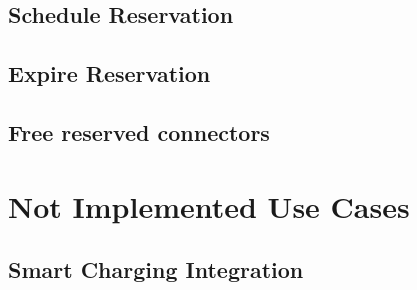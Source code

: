 \subsection{Schedule Reservation}
\label{ch:Process Design:sec:Implemented Use Cases:ssec:Schedule Reservation}


\subsection{Expire Reservation}
\label{ch:Process Design:sec:Implemented Use Cases:ssec:Expire Reservation}


\subsection{Free reserved connectors}
\label{ch:Process Design:sec:Implemented Use Cases:ssec:Free reserved connectors}


\section{Not Implemented Use Cases}
\label{ch:Process Design:sec:Not Implemented Use Cases}

\subsection{Smart Charging Integration}
\label{ch:Process Design:sec:Not Implemented Use Cases:sec:Smart Charging}
